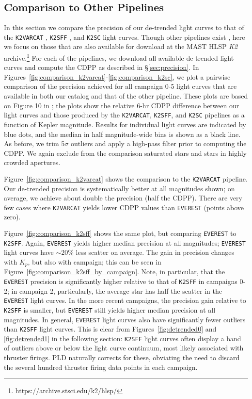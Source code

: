 \documentclass[]{emulateapj}
\begin{document}
\subsection{Comparison to Other Pipelines}
\label{sec:comparison}
In this section we compare the precision of our de-trended light curves to that of the
\texttt{K2VARCAT} \citep{ARM15}, \texttt{K2SFF} \citep{VJ14}, and \texttt{K2SC} \citep{AIG16} light curves. Though other
pipelines exist \citep[e.g.,][]{LUN15, HUA15, CRO15}, here we focus on those that 
are also available for download at
the MAST HLSP \emph{K2} archive.\footnote{https://archive.stsci.edu/k2/hlsp/}
For each of the pipelines, we download all available de-trended light curves and
compute the CDPP as described in \S\ref{sec:precision}. In 
Figures~\ref{fig:comparison_k2varcat}-\ref{fig:comparison_k2sc}, we plot a pairwise
comparison of the precision achieved for all campaign 0-5 light curves that are
available in both our catalog and that of the other pipeline. These plots are based
on Figure 10 in \cite{AIG16}; the plots show the relative 6-hr CDPP difference between
our light curves and those produced by the \texttt{K2VARCAT}, \texttt{K2SFF}, and \texttt{K2SC}
pipelines as a function of Kepler magnitude. Results for individual light curves are indicated by
blue dots, and the median in half magnitude-wide bins is shown as a black line.
As before, we trim
5$\sigma$ outliers and apply a high-pass filter prior to computing the CDPP.
We again exclude from the comparison saturated stars and stars in highly crowded apertures.

Figure~\ref{fig:comparison_k2varcat} shows the comparison to the \texttt{K2VARCAT}
pipeline. Our de-trended precision is systematically better at all magnitudes shown;
on average, we achieve about double the precision (half the CDPP). There are very
few cases where \texttt{K2VARCAT} yields lower CDPP values than \texttt{EVEREST}
(points above zero).

Figure~\ref{fig:comparison_k2sff} shows the same plot, but comparing \texttt{EVEREST} to
\texttt{K2SFF}. Again, \texttt{EVEREST} yields higher median precision at all
magnitudes; \texttt{EVEREST} light curves have $\sim 20\%$ less scatter on average. The
gain in precision changes with $K_p$, but also with campaign; this can be seen in 
Figure~\ref{fig:comparison_k2sff_by_campaign}. Note, in particular, that the \texttt{EVEREST}
precision is significantly higher relative to that of \texttt{K2SFF} in campaigns 0-2;
in campaign 2, particularly, the average star has half the scatter in the \texttt{EVEREST}
light curves. In the more recent campaigns, the precision gain relative to \texttt{K2SFF}
is smaller, but \texttt{EVEREST} still yields higher median precision at all magnitudes.
In general, \texttt{EVEREST} light curves also have significantly fewer outliers than \texttt{K2SFF} light curves.
This is clear from Figures~\ref{fig:detrended0} and \ref{fig:detrended1} in the
following section: \texttt{K2SFF} light curves often display a band of outliers
above or below the light curve continuum, most likely associated with thruster firings. PLD
naturally corrects for these, obviating the need to discard the several hundred thruster
firing data points in each campaign.
\end{document}
